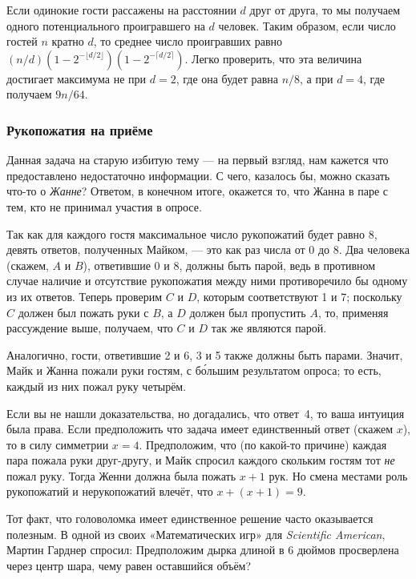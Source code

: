 Если одинокие гости рассажены на расстоянии $d$ друг от друга, то мы получаем одного потенциального проигравшего на $d$ человек.
Таким образом, если число гостей $n$ кратно $d$, то среднее число проигравших равно $(n/d)(1-2^{-\lfloor d/2\rfloor})(1-2^{-\lceil d/2\rceil})$.
Легко проверить, что эта величина достигает максимума не при $d=2$, где она будет равна $n/8$, а при $d=4$, где получаем $9n/64$.
\heart

\subsubsection*{Рукопожатия на приёме}%

Данная задача на старую избитую тему --- на первый взгляд, нам кажется что предоставлено недостаточно информации.
С чего, казалось бы, можно сказать что-то о \emph{Жанне}?
Ответом, в конечном итоге, окажется то, что Жанна в паре с тем, кто не принимал участия в опросе.

Так как для каждого гостя максимальное число рукопожатий будет равно 8, 
девять ответов, полученных Майком, --- это как раз числа от 0 до 8.
Два человека (скажем, $A$ и $B$), ответившие 0 и 8, должны быть парой, ведь в противном случае наличие и отсутствие рукопожатия между ними противоречило бы одному из их ответов.
Теперь проверим $C$ и $D$, которым соответствуют 1 и 7;
поскольку $C$ должен был пожать руки с $B$, а $D$ должен был пропустить $A$, то, применяя рассуждение выше, получаем, что $C$ и $D$ так же являются парой.

Аналогично, гости, ответившие 2 и 6, 3 и 5 также должны быть парами.
Значит, Майк и Жанна пожали руки гостям, с б\'{о}льшим результатом опроса;
то есть, каждый из них пожал руку четырём.
\heart

Если вы не нашли доказательства, но догадались, что ответ~4, то ваша интуиция была права.
Если предположить что задача имеет единственный ответ (скажем $x$), то в силу симметрии $x=4$.
Предположим, что (по какой-то причине) каждая пара пожала руки друг-другу, и Майк спросил каждого скольким гостям тот \emph{не} пожал руку.
Тогда Женни должна была пожать $x+1$ рук.
Но смена местами роль рукопожатий и нерукопожатий влечёт, что $x+(x+1)=9$.

Тот факт, что головоломка имеет единственное решение часто оказывается полезным.
В одной из своих «Математических игр» для \emph{Scientific American}, Мартин Гарднер спросил:
Предположим дырка длиной в 6 дюймов просверлена через центр шара, чему равен оставшийся объём?

